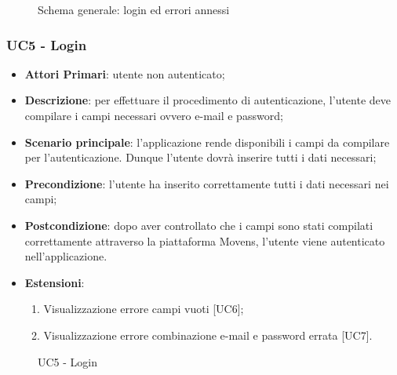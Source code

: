 \begin{figure}[h]
	\centering
	\caption{Schema generale: login ed errori annessi}
\end{figure}
\subsubsection{UC5 - Login}
\begin{itemize}
	\item \textbf{Attori Primari}: utente non autenticato;
	\item \textbf{Descrizione}: per effettuare il procedimento di autenticazione, l'utente deve compilare i campi necessari ovvero e-mail e password;
	\item \textbf{Scenario principale}: l'applicazione rende disponibili i campi da compilare per l'autenticazione. Dunque l'utente dovrà inserire tutti i dati necessari;
	\item \textbf{Precondizione}: l'utente ha inserito correttamente tutti i dati necessari nei campi;
	\item \textbf{Postcondizione}: dopo aver controllato che i campi sono stati compilati correttamente attraverso la piattaforma Movens\glo, l'utente viene autenticato nell'applicazione.
	\item \textbf{Estensioni}:
		\begin{enumerate}
			\item Visualizzazione errore campi vuoti [UC6];
			\item Visualizzazione errore combinazione e-mail e password errata [UC7].
		\end{enumerate}	
\end{itemize}
\begin{figure}[h]
	\centering
	\caption{UC5 - Login}
\end{figure}
